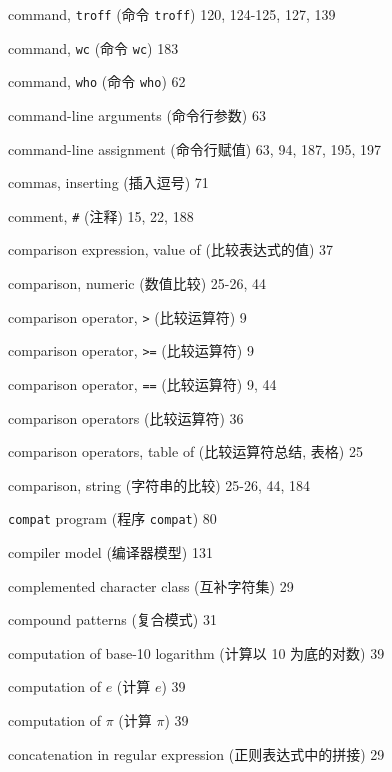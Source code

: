 \begin{multicols}{2}
\hangindent=2pc  command, \verb'troff' (命令 \verb'troff')
120, 124-125, 127, 139

\hangindent=2pc  command, \verb'wc' (命令 \verb'wc') 183


\hangindent=2pc  command, \verb'who' (命令 \verb'who') 62

\hangindent=2pc  command-line arguments (命令行参数) 63

\hangindent=2pc  command-line assignment (命令行赋值)
63, 94, 187, 195, 197

\hangindent=2pc  commas, inserting (插入逗号) 71

\hangindent=2pc  comment, \verb'#' (注释) 15, 22, 188

\hangindent=2pc  comparison expression, value of
(比较表达式的值) 37

\hangindent=2pc  comparison, numeric (数值比较) 25-26, 44

\hangindent=2pc  comparison operator, \verb'>' (比较运算符) 9

\hangindent=2pc  comparison operator, \verb'>=' (比较运算符) 9

\hangindent=2pc  comparison operator, \verb'==' (比较运算符) 9, 44

\hangindent=2pc  comparison operators (比较运算符) 36

\hangindent=2pc  comparison operators, table of (比较运算符总结,
 表格) 25

\hangindent=2pc  comparison, string (字符串的比较) 25-26, 44, 184

\hangindent=2pc  \verb'compat' program (程序 \verb'compat') 80

\hangindent=2pc  compiler model (编译器模型) 131

\hangindent=2pc  complemented character class (互补字符集) 29

\hangindent=2pc  compound patterns (复合模式) 31

\hangindent=2pc  computation of base-10 logarithm (计算以 10
为底的对数) 39

\hangindent=2pc  computation of $e$ (计算 $e$) 39

\hangindent=2pc  computation of $\pi$ (计算 $\pi$) 39

\hangindent=2pc  concatenation in regular expression
(正则表达式中的拼接) 29


\end{multicols}
